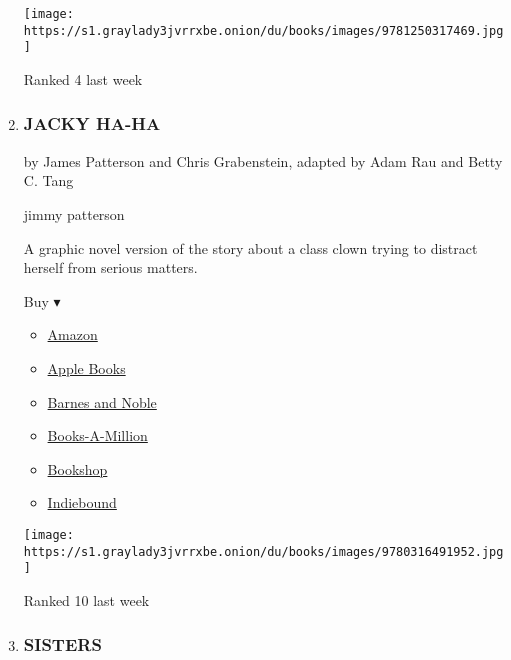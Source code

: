 \begin{enumerate}
  \texttt{[image: https://s1.graylady3jvrrxbe.onion/du/books/images/9781250317469.jpg]}

  Ranked 4 last week
\item
  \hypertarget{jacky-ha-ha}{%
  \subsubsection{JACKY HA-HA}\label{jacky-ha-ha}}

  by James Patterson and Chris Grabenstein, adapted by Adam Rau and
  Betty C. Tang

  jimmy patterson

  A graphic novel version of the story about a class clown trying to
  distract herself from serious matters.

  Buy ▾

  \begin{itemize}
  \tightlist
  \item
    \href{https://www.amazon.com/dp/0316491950?tag=NYTBSREV-20\&tag=NYTBS-20}{Amazon}
  \item
    \href{https://du-gae-books-dot-nyt-du-prd.appspot.com/buy?title=JACKY+HA-HA\&author=James+Patterson+and+Chris+Grabenstein\%2C+adapted++Adam+Rau+and+Betty+C+Tang}{Apple
    Books}
  \item
    \href{https://www.anrdoezrs.net/click-7990613-11819508?url=https\%3A\%2F\%2Fwww.barnesandnoble.com\%2Fw\%2F\%3Fean\%3D9780316491952}{Barnes
    and Noble}
  \item
    \href{https://www.anrdoezrs.net/click-7990613-35140?url=https\%3A\%2F\%2Fwww.booksamillion.com\%2Fp\%2FJACKY\%2BHA-HA\%2FJames\%2BPatterson\%2Band\%2BChris\%2BGrabenstein\%252C\%2Badapted\%2B\%2BAdam\%2BRau\%2Band\%2BBetty\%2BC\%2BTang\%2F9780316491952}{Books-A-Million}
  \item
    \href{https://bookshop.org/a/3546/9780316491952}{Bookshop}
  \item
    \href{https://www.indiebound.org/book/9780316491952?aff=NYT}{Indiebound}
  \end{itemize}

  \texttt{[image: https://s1.graylady3jvrrxbe.onion/du/books/images/9780316491952.jpg]}

  Ranked 10 last week
\item
  \hypertarget{sisters}{%
  \subsubsection{SISTERS}\label{sisters}}


\end{enumerate}
